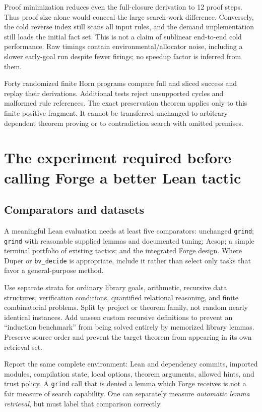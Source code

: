 \documentclass[11pt,a4paper]{article}
\newcommand{\grind}{\texttt{grind}}
\newcommand{\code}[1]{\texttt{#1}}
\begin{document}
Proof minimization reduces even the full-closure derivation to 12 proof steps. Thus proof size alone would conceal the large search-work difference. Conversely, the cold reverse index still scans all input rules, and the demand implementation still loads the initial fact set. This is not a claim of sublinear end-to-end cold performance. Raw timings contain environmental/allocator noise, including a slower early-goal run despite fewer firings; no speedup factor is inferred from them.

Forty randomized finite Horn programs compare full and sliced success and replay their derivations. Additional tests reject unsupported cycles and malformed rule references. The exact preservation theorem applies only to this finite positive fragment. It cannot be transferred unchanged to arbitrary dependent theorem proving or to contradiction search with omitted premises.

\section{The experiment required before calling Forge a better Lean tactic}
\subsection{Comparators and datasets}
A meaningful Lean evaluation needs at least five comparators: unchanged \grind; \grind{} with reasonable supplied lemmas and documented tuning; Aesop; a simple terminal portfolio of existing tactics; and the integrated Forge design. Where Duper or \code{bv\_decide} is appropriate, include it rather than select only tasks that favor a general-purpose method.

Use separate strata for ordinary library goals, arithmetic, recursive data structures, verification conditions, quantified relational reasoning, and finite combinatorial problems. Split by project or theorem family, not random nearly identical instances. Add unseen custom recursive definitions to prevent an ``induction benchmark'' from being solved entirely by memorized library lemmas. Preserve source order and prevent the target theorem from appearing in its own retrieval set.

Report the same complete environment: Lean and dependency commits, imported modules, compilation state, local options, theorem arguments, allowed hints, and trust policy. A \grind{} call that is denied a lemma which Forge receives is not a fair measure of search capability. One can separately measure \emph{automatic lemma retrieval}, but must label that comparison correctly.
\end{document}
